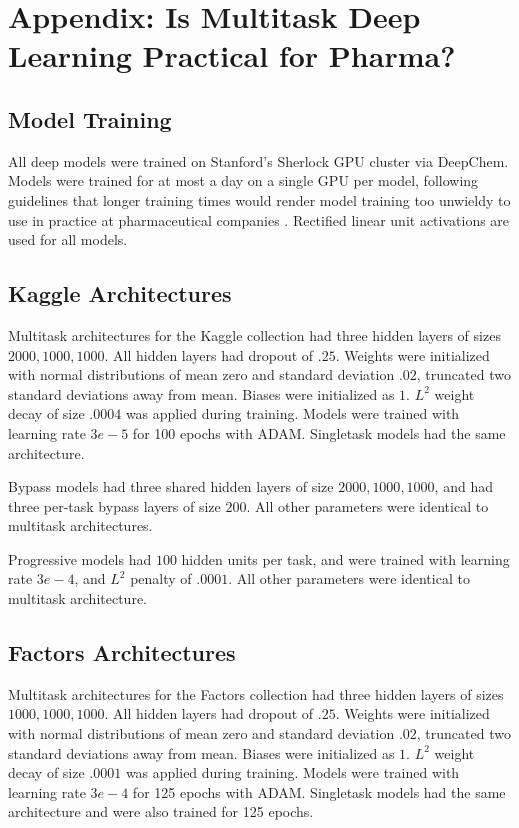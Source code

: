\section{Appendix: Is Multitask Deep Learning Practical for Pharma?}

\subsection{Model Training}

All deep models were trained on Stanford's Sherlock GPU cluster via DeepChem. Models were trained for at most a day on a single GPU per model,
following guidelines that longer training times would render model training too unwieldy to use in practice at pharmaceutical companies \cite{ma2015deep}.  Rectified linear unit activations are used for all models.


\subsection{Kaggle Architectures}
Multitask architectures for the Kaggle collection had three hidden layers of sizes $2000, 1000, 1000$. All hidden layers had dropout of $.25$. Weights were initialized with normal distributions of mean zero and standard deviation $.02$, truncated two standard deviations away from mean. Biases were initialized as $1$. $L^2$ weight decay of size $.0004$ was applied during training. Models were trained with learning rate $3e-5$ for 100 epochs with ADAM. Singletask models had the same architecture.

Bypass models had three shared hidden layers of size $2000, 1000, 1000$, and had three per-task bypass layers of size $200$. All other parameters were identical to multitask architectures.

Progressive models had $100$ hidden units per task, and were trained with learning rate $3e-4$, and $L^2$ penalty of $.0001$. All other parameters were identical to multitask architecture.

\subsection{Factors Architectures}
Multitask architectures for the Factors collection had three hidden layers of sizes $1000, 1000, 1000$. All hidden layers had dropout of $.25$. Weights were initialized with normal distributions of mean zero and standard deviation $.02$, truncated two standard deviations away from mean. Biases were initialized as $1$. $L^2$ weight decay of size $.0001$ was applied during training. Models were trained with learning rate $3e-4$ for 125 epochs with ADAM. Singletask models had the same architecture and were also trained for 125 epochs.

